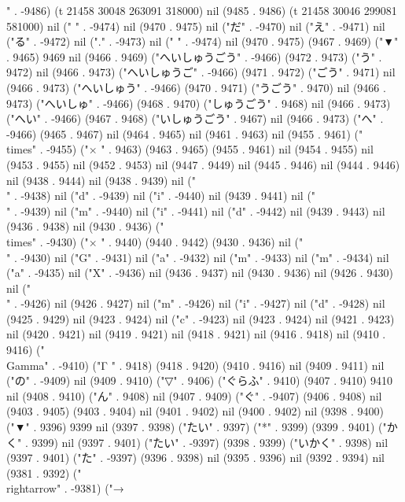 " . -9486) (t 21458 30048 263091 318000) nil (9485 . 9486) (t 21458 30046 299081 581000) nil (" " . -9474) nil (9470 . 9475) nil ("だ" . -9470) nil ("え" . -9471) nil ("る" . -9472) nil ("." . -9473) nil (" " . -9474) nil (9470 . 9475) (9467 . 9469) ("▼" . 9465) 9469 nil (9466 . 9469) ("へいしゅうごう" . -9466) (9472 . 9473) ("う" . 9472) nil (9466 . 9473) ("へいしゅうご" . -9466) (9471 . 9472) ("ごう" . 9471) nil (9466 . 9473) ("へいしゅう" . -9466) (9470 . 9471) ("うごう" . 9470) nil (9466 . 9473) ("へいしゅ" . -9466) (9468 . 9470) ("しゅうごう" . 9468) nil (9466 . 9473) ("へい" . -9466) (9467 . 9468) ("いしゅうごう" . 9467) nil (9466 . 9473) ("へ" . -9466) (9465 . 9467) nil (9464 . 9465) nil (9461 . 9463) nil (9455 . 9461) ("\\times" . -9455) ("×
" . 9463) (9463 . 9465) (9455 . 9461) nil (9454 . 9455) nil (9453 . 9455) nil (9452 . 9453) nil (9447 . 9449) nil (9445 . 9446) nil (9444 . 9446) nil (9438 . 9444) nil (9438 . 9439) nil ("\\" . -9438) nil ("d" . -9439) nil ("i" . -9440) nil (9439 . 9441) nil ("\\" . -9439) nil ("m" . -9440) nil ("i" . -9441) nil ("d" . -9442) nil (9439 . 9443) nil (9436 . 9438) nil (9430 . 9436) ("\\times" . -9430) ("×
" . 9440) (9440 . 9442) (9430 . 9436) nil ("\\" . -9430) nil ("G" . -9431) nil ("a" . -9432) nil ("m" . -9433) nil ("m" . -9434) nil ("a" . -9435) nil ("X" . -9436) nil (9436 . 9437) nil (9430 . 9436) nil (9426 . 9430) nil ("\\" . -9426) nil (9426 . 9427) nil ("m" . -9426) nil ("i" . -9427) nil ("d" . -9428) nil (9425 . 9429) nil (9423 . 9424) nil ("c" . -9423) nil (9423 . 9424) nil (9421 . 9423) nil (9420 . 9421) nil (9419 . 9421) nil (9418 . 9421) nil (9416 . 9418) nil (9410 . 9416) ("\\Gamma" . -9410) ("Γ
" . 9418) (9418 . 9420) (9410 . 9416) nil (9409 . 9411) nil ("の" . -9409) nil (9409 . 9410) ("▽" . 9406) ("ぐらふ" . 9410) (9407 . 9410) 9410 nil (9408 . 9410) ("ん" . 9408) nil (9407 . 9409) ("ぐ" . -9407) (9406 . 9408) nil (9403 . 9405) (9403 . 9404) nil (9401 . 9402) nil (9400 . 9402) nil (9398 . 9400) ("▼" . 9396) 9399 nil (9397 . 9398) ("たい" . 9397) ("*" . 9399) (9399 . 9401) ("かく" . 9399) nil (9397 . 9401) ("たい" . -9397) (9398 . 9399) ("いかく" . 9398) nil (9397 . 9401) ("た" . -9397) (9396 . 9398) nil (9395 . 9396) nil (9392 . 9394) nil (9381 . 9392) ("\\rightarrow" . -9381) ("→
